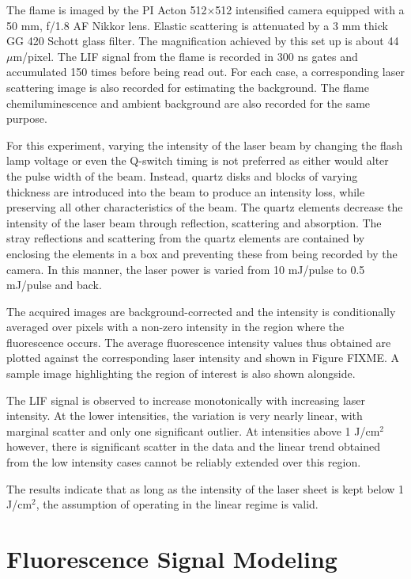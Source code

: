 The flame is imaged by the PI Acton 512\(\times\)512 intensified camera equipped with a 50 mm, f/1.8 AF Nikkor lens.
Elastic scattering is attenuated by a 3 mm thick GG 420 Schott glass filter.
The magnification achieved by this set up is about 44 \(\mu\)m/pixel.
The LIF signal from the flame is recorded in 300 ns gates and accumulated 150 times before being read out.
For each case, a corresponding laser scattering image is also recorded for estimating the background.
The flame chemiluminescence and ambient background are also recorded for the same purpose.

For this experiment, varying the intensity of the laser beam by changing the flash lamp voltage or even the Q-switch timing is not preferred as either would alter the pulse width of the beam.
Instead, quartz disks and blocks of varying thickness are introduced into the beam to produce an intensity loss, while preserving all other characteristics of the beam.
The quartz elements decrease the intensity of the laser beam through reflection, scattering and absorption.
The stray reflections and scattering from the quartz elements are contained by enclosing the elements in a box and preventing these from being recorded by the camera.
In this manner, the laser power is varied from 10 mJ/pulse to 0.5 mJ/pulse and back.

The acquired images are background-corrected and the intensity is conditionally averaged over pixels with a non-zero intensity in the region where the fluorescence occurs.
The average fluorescence intensity values thus obtained are plotted against the corresponding laser intensity and shown in Figure FIXME.
A sample image highlighting the region of interest is also shown alongside.

The LIF signal is observed to increase monotonically with increasing laser intensity.
At the lower intensities, the variation is very nearly linear, with marginal scatter and only one significant outlier.
At intensities above 1 J/cm\(^2\) however, there is significant scatter in the data and the linear trend obtained from the low intensity cases cannot be reliably extended over this region.

The results indicate that as long as the intensity of the laser sheet is kept below 1 J/cm\(^2\), the assumption of operating in the linear regime is valid.

\section{Fluorescence Signal Modeling}

